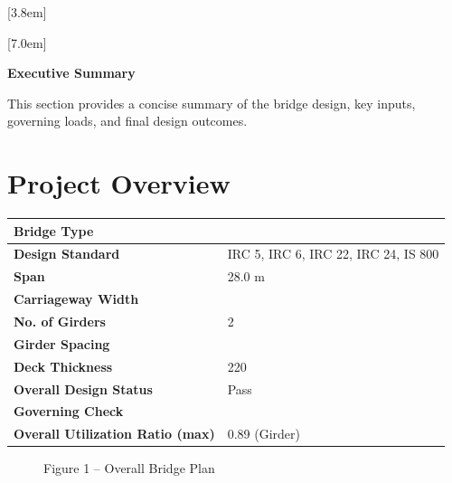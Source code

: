 \documentclass[12pt,a4paper]{report}
\numberwithin{table}{chapter}
\numberwithin{figure}{chapter}
\begin{document}
[3.8em]
  {\normalfont}
  {\contentslabel{2.3em}}
  {\hspace*{-2.3em}}
  {\hfill\contentspage}

[7.0em]
  {\normalfont}
  {\contentslabel{3.2em}}
  {\hspace*{-3.2em}}
  {\hfill\contentspage}

\newpage
\renewcommand{\contentsname}{\centering\Large\bfseries Table of Contents}
\tableofcontents


\newpage
{\centering\Large\bfseries Executive Summary\par}
\vspace{0.8em}

This section provides a concise summary of the bridge design, key inputs, governing loads, and final design outcomes.

\section*{Project Overview}
\label{sec:project-overview}


\begin{tabular}{|L{5.5cm}|L{8.5cm}|}
\hline
\textbf{Bridge Type} &  \\
\hline
\textbf{Design Standard} & IRC 5, IRC 6, IRC 22, IRC 24, IS 800 \\
\hline
\textbf{Span} & 28.0 m \\
\hline
\textbf{Carriageway Width} &  \\
\hline
\textbf{No. of Girders} & 2 \\
\hline
\textbf{Girder Spacing} &  \\
\hline
\textbf{Deck Thickness} & 220 \\
\hline
\textbf{Overall Design Status} & Pass \\
\hline
\textbf{Governing Check} &  \\
\hline
\textbf{Overall Utilization Ratio (max)} & 0.89 (Girder) \\
\hline
\end{tabular}


\begin{figure}[H]
\centering
{}
\caption*{Figure 1 -- Overall Bridge Plan}
\end{figure}

\newpage
\end{document}
